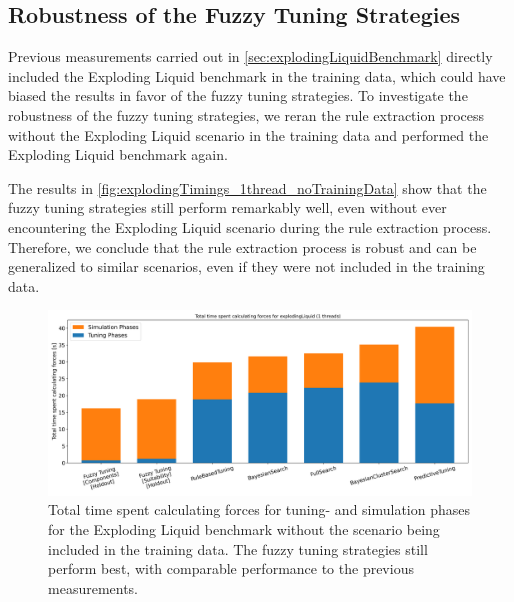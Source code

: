 \newpage

\subsection{Robustness of the Fuzzy Tuning Strategies}

Previous measurements carried out in \autoref{sec:explodingLiquidBenchmark} directly included the Exploding Liquid benchmark in the training data, which could have biased the results in favor of the fuzzy tuning strategies. To investigate the robustness of the fuzzy tuning strategies, we reran the rule extraction process without the Exploding Liquid scenario in the training data and performed the Exploding Liquid benchmark again.

The results in \autoref{fig:explodingTimings_1thread_noTrainingData} show that the fuzzy tuning strategies still perform remarkably well, even without ever encountering the Exploding Liquid scenario during the rule extraction process. Therefore, we conclude that the rule extraction process is robust and can be generalized to similar scenarios, even if they were not included in the training data.

\begin{figure}[H]
    \centering

    \includegraphics[width=\columnwidth,trim={0cm 0 0cm 0.9cm},clip]{figures/Benchmark/ExplodingLiquidHoldout/total_time_explodingLiquid_1.png}
    \caption{
        Total time spent calculating forces for tuning- and simulation phases for the Exploding Liquid benchmark without the scenario being included in the training data. The fuzzy tuning strategies still perform best, with comparable performance to the previous measurements.
    }
    \label{fig:explodingTimings_1thread_noTrainingData}
\end{figure}